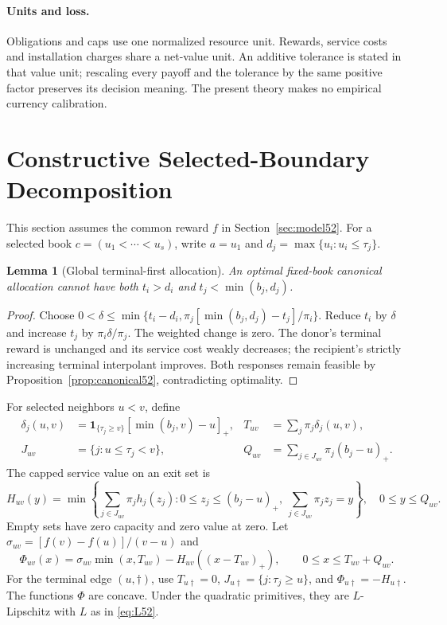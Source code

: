 \documentclass[11pt,letterpaper]{article}
\newtheorem{lemma}[theorem]{Lemma}
\theoremstyle{definition}\newtheorem{remark}[theorem]{Remark}
\begin{document}
\paragraph{Units and loss.} Obligations and caps use one normalized resource unit. Rewards, service costs and installation charges share a net-value unit. An additive tolerance is stated in that value unit; rescaling every payoff and the tolerance by the same positive factor preserves its decision meaning. The present theory makes no empirical currency calibration.
\section{Constructive Selected-Boundary Decomposition}\label{sec:boundaries52}
This section assumes the common reward $f$ in Section~\ref{sec:model52}. For a selected book $c=(u_1<\cdots<u_s)$, write $a=u_1$ and $d_j=\max\{u_i:u_i\leq\tau_j\}$.
\begin{lemma}[Global terminal-first allocation]\label{lem:terminal52}
An optimal fixed-book canonical allocation cannot have both $t_i>d_i$ and $t_j<\min(b_j,d_j)$.
\end{lemma}
\begin{proof}
Choose $0<\delta\leq\min\{t_i-d_i,\pi_j[\min(b_j,d_j)-t_j]/\pi_i\}$. Reduce $t_i$ by $\delta$ and increase $t_j$ by $\pi_i\delta/\pi_j$. The weighted change is zero. The donor's terminal reward is unchanged and its service cost weakly decreases; the recipient's strictly increasing terminal interpolant improves. Both responses remain feasible by Proposition~\ref{prop:canonical52}, contradicting optimality.
\end{proof}
For selected neighbors $u<v$, define
\begin{align}
 \delta_j(u,v)&=\mathbf1_{\{\tau_j\geq v\}}[\min(b_j,v)-u]_+,
 &T_{uv}&=\sum_j\pi_j\delta_j(u,v),\label{eq:terminalarc52}\\
 J_{uv}&=\{j:u\leq\tau_j<v\},
 &Q_{uv}&=\sum_{j\in J_{uv}}\pi_j(b_j-u)_+.\label{eq:exit52}
\end{align}
The capped service value on an exit set is
\begin{equation}\label{eq:servicearc52}
 H_{uv}(y)=\min\left\{\sum_{j\in J_{uv}}\pi_jh_j(z_j):
 0\leq z_j\leq(b_j-u)_+,\ \sum_{j\in J_{uv}}\pi_jz_j=y\right\},\quad 0\leq y\leq Q_{uv}.
\end{equation}
Empty sets have zero capacity and zero value at zero. Let $\sigma_{uv}=[f(v)-f(u)]/(v-u)$ and
\begin{equation}\label{eq:arc52}
 \Phi_{uv}(x)=\sigma_{uv}\min(x,T_{uv})-H_{uv}((x-T_{uv})_+),
 \qquad 0\leq x\leq T_{uv}+Q_{uv}.
\end{equation}
For the terminal edge $(u,\dagger)$, use $T_{u\dagger}=0$, $J_{u\dagger}=\{j:\tau_j\geq u\}$, and $\Phi_{u\dagger}=-H_{u\dagger}$. The functions $\Phi$ are concave. Under the quadratic primitives, they are $L$-Lipschitz with $L$ as in \eqref{eq:L52}.
\end{document}
